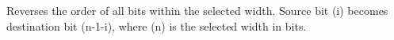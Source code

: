 Reverses the order of all bits within the selected width. Source bit (i) becomes destination bit (n-1-i),
where (n) is the selected width in bits.
